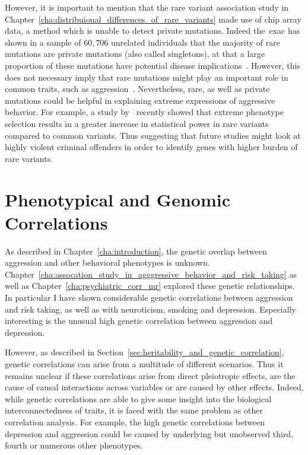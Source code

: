 However, it is important to mention that the rare variant association study in Chapter~\ref{cha:distribuional_differences_of_rare_variants} made use of chip array data, a method which is unable to detect private mutations.
Indeed the~\acrfull{exac} has shown in a sample of $60,706$ unrelated individuals that the majority of rare mutations are private mutations (also called singletons), at that a large proportion of these mutations have potential disease implications~\cite{Lek2016,Kobayashi2017}.
However, this does not necessary imply that rare mutations might play an important role in common traits, such as aggression~\cite{Chabris2015}.
Nevertheless, rare, as well as private mutations could be helpful in explaining extreme expressions of aggressive behavior.
For example, a study by~\cite{Peloso2016} recently showed that extreme phenotype selection results in a greater increase in statistical power in rare variants compared to common variants.
Thus suggesting that future studies might look at highly violent criminal offenders in order to identify genes with higher burden of rare variants.

\section{Phenotypical and Genomic Correlations}
\label{sec:phenotypical_and_genomic_correlations}

As described in Chapter~\ref{cha:introduction}, the genetic overlap between aggression and other behavioral phenotypes is unknown.
Chapter~\ref{cha:assocation_study_in_agggressive_behavior_and_risk_taking} as well as Chapter~\ref{cha:psychiatric_corr_mr} explored these genetic relationships.
In particular I have shown considerable genetic correlations between aggression and risk taking, as well as with neuroticism, smoking and depression. 
Especially interesting is the unusual high genetic correlation between aggression and depression.

However, as described in Section~\ref{sec:heritability_and_genetic_correlation}, genetic correlations can arise from a multitude of different scenarios.
Thus it remains unclear if these correlations arise from direct pleiotropic effects, are the cause of causal interactions across variables or are caused by other effects. 
Indeed, while genetic correlations are able to give some insight into the biological interconnectedness of traits, it is faced with the same problem as other correlation analysis. 
For example, the high genetic correlations between depression and aggression could be caused by underlying but unobserved third, fourth or numerous other phenotypes.

